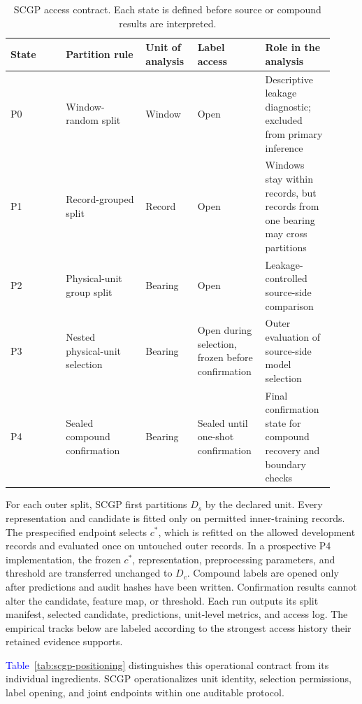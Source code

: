 \documentclass[machines,article,submit,oneauthor,pdftex]{Definitions/mdpi}
\newcommand{\tbl}[1]{\textcolor{blue}{Table~#1}}
\begin{document}
\begin{table}[t]
\centering
\scriptsize
\setlength{\tabcolsep}{2pt}
\renewcommand{\arraystretch}{1.15}
\caption{SCGP access contract. Each state is defined before source or compound results are interpreted.}
\label{tab:scgp-contract}
\begin{tabular}{p{0.16\linewidth} p{0.23\linewidth} p{0.15\linewidth} p{0.18\linewidth} p{0.20\linewidth}}
\hline
State & Partition rule & Unit of analysis & Label access & Role in the analysis \\
\hline
P0 & Window-random split & Window & Open & Descriptive leakage diagnostic; excluded from primary inference \\
P1 & Record-grouped split & Record & Open & Windows stay within records, but records from one bearing may cross partitions \\
P2 & Physical-unit group split & Bearing & Open & Leakage-controlled source-side comparison \\
P3 & Nested physical-unit selection & Bearing & Open during selection, frozen before confirmation & Outer evaluation of source-side model selection \\
P4 & Sealed compound confirmation & Bearing & Sealed until one-shot confirmation & Final confirmation state for compound recovery and boundary checks \\
\hline
\end{tabular}
\end{table}

For each outer split, SCGP first partitions $D_s$ by the declared unit. Every representation and candidate is fitted only on permitted inner-training records. The prespecified endpoint selects $c^\ast$, which is refitted on the allowed development records and evaluated once on untouched outer records. In a prospective P4 implementation, the frozen $c^\ast$, representation, preprocessing parameters, and threshold are transferred unchanged to $D_c$. Compound labels are opened only after predictions and audit hashes have been written. Confirmation results cannot alter the candidate, feature map, or threshold. Each run outputs its split manifest, selected candidate, predictions, unit-level metrics, and access log. The empirical tracks below are labeled according to the strongest access history their retained evidence supports.

\tbl{\ref{tab:scgp-positioning}} distinguishes this operational contract from its individual ingredients. SCGP operationalizes unit identity, selection permissions, label opening, and joint endpoints within one auditable protocol.
\end{document}
